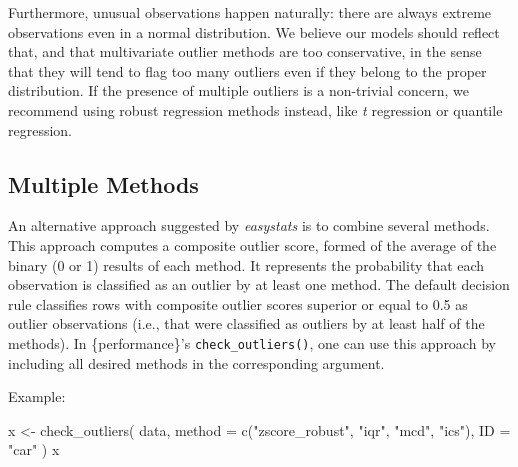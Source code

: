 \documentclass[
]{article}
\newenvironment{Shaded}{\begin{snugshade}}{\end{snugshade}}
\newcommand{\AttributeTok}[1]{\textcolor[rgb]{0.77,0.63,0.00}{#1}}
\newcommand{\FunctionTok}[1]{\textcolor[rgb]{0.00,0.00,0.00}{#1}}
\newcommand{\NormalTok}[1]{#1}
\newcommand{\OtherTok}[1]{\textcolor[rgb]{0.56,0.35,0.01}{#1}}
\newcommand{\StringTok}[1]{\textcolor[rgb]{0.31,0.60,0.02}{#1}}
\begin{document}
Furthermore, unusual observations happen naturally: there are always extreme observations even in a normal distribution. We believe our models should reflect that, and that multivariate outlier methods are too conservative, in the sense that they will tend to flag too many outliers even if they belong to the proper distribution. If the presence of multiple outliers is a non-trivial concern, we recommend using robust regression methods instead, like \emph{t} regression or quantile regression.

\hypertarget{multiple-methods}{%
\subsection{Multiple Methods}\label{multiple-methods}}

An alternative approach suggested by \emph{easystats} is to combine several methods. This approach computes a composite outlier score, formed of the average of the binary (0 or 1) results of each method. It represents the probability that each observation is classified as an outlier by at least one method. The default decision rule classifies rows with composite outlier scores superior or equal to 0.5 as outlier observations (i.e., that were classified as outliers by at least half of the methods). In \{performance\}'s \texttt{check\_outliers()}, one can use this approach by including all desired methods in the corresponding argument.

Example:



\begin{Shaded}
\begin{Highlighting}[]
\NormalTok{x }\OtherTok{\textless{}{-}} \FunctionTok{check\_outliers}\NormalTok{(}
\NormalTok{  data,}
  \AttributeTok{method =} \FunctionTok{c}\NormalTok{(}\StringTok{"zscore\_robust"}\NormalTok{, }\StringTok{"iqr"}\NormalTok{, }\StringTok{"mcd"}\NormalTok{, }\StringTok{"ics"}\NormalTok{),}
  \AttributeTok{ID =} \StringTok{"car"}
\NormalTok{)}
\NormalTok{x}
\end{Highlighting}
\end{Shaded}
\end{document}
